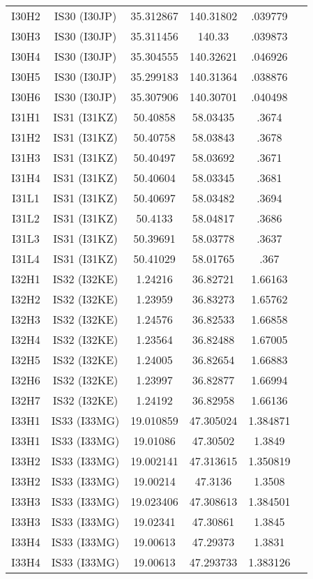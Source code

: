 \documentclass[a4paper, 10pt]{report}
\begin{document}
{\begin{center}
\begin{tabular}{|c|c|c|c|c|c|}
I30H2&	IS30 (I30JP)&	 	35.312867&	140.31802&	.039779\\
I30H3&	IS30 (I30JP)&	 	35.311456&	140.33&	.039873\\
I30H4&	IS30 (I30JP)&	 	35.304555&	140.32621&	.046926\\
I30H5&	IS30 (I30JP)&	 	35.299183&	140.31364&	.038876\\
I30H6&	IS30 (I30JP)&	 	35.307906&	140.30701&	.040498\\
I31H1&	IS31 (I31KZ)&	 	50.40858&	58.03435&	.3674\\
I31H2&	IS31 (I31KZ)&	 	50.40758&	58.03843&	.3678\\
I31H3&	IS31 (I31KZ)&	 	50.40497&	58.03692&	.3671\\
I31H4&	IS31 (I31KZ)&	 	50.40604&	58.03345&	.3681\\
I31L1&	IS31 (I31KZ)&	 	50.40697&	58.03482&	.3694\\
I31L2&	IS31 (I31KZ)&	 	50.4133&	58.04817&	.3686\\
I31L3&	IS31 (I31KZ)&	 	50.39691&	58.03778&	.3637\\
I31L4&	IS31 (I31KZ)&	 	50.41029&	58.01765&	.367\\
I32H1&	IS32 (I32KE)&	 	1.24216&	36.82721&	1.66163\\
I32H2&	IS32 (I32KE)&	 	1.23959&	36.83273&	1.65762\\
I32H3&	IS32 (I32KE)&	 	1.24576&	36.82533&	1.66858\\
I32H4&	IS32 (I32KE)&	 	1.23564&	36.82488&	1.67005\\
I32H5&	IS32 (I32KE)&	 	1.24005&	36.82654&	1.66883\\
I32H6&	IS32 (I32KE)&	 	1.23997&	36.82877&	1.66994\\
I32H7&	IS32 (I32KE)&	 	1.24192&	36.82958&	1.66136\\
I33H1&	IS33 (I33MG)&	 	19.010859&	47.305024&	1.384871\\
I33H1&	IS33 (I33MG)&	 	19.01086&	47.30502&	1.3849\\
I33H2&	IS33 (I33MG)&	 	19.002141&	47.313615&	1.350819\\
I33H2&	IS33 (I33MG)&	 	19.00214&	47.3136&	1.3508\\
I33H3&	IS33 (I33MG)&	 	19.023406&	47.308613&	1.384501\\
I33H3&	IS33 (I33MG)&	 	19.02341&	47.30861&	1.3845\\
I33H4&	IS33 (I33MG)&	 	19.00613&	47.29373&	1.3831\\
I33H4&	IS33 (I33MG)&	 	19.00613&	47.293733&	1.383126\\


\end{tabular}
\end{center}}
\end{document}
